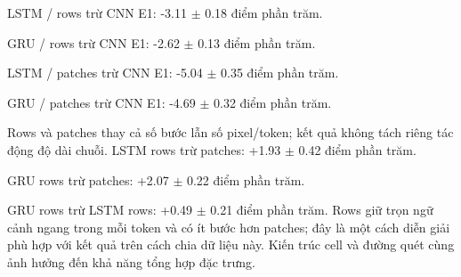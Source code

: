 LSTM / rows trừ CNN E1: -3.11 $\pm$ 0.18 điểm phần trăm.

GRU / rows trừ CNN E1: -2.62 $\pm$ 0.13 điểm phần trăm.

LSTM / patches trừ CNN E1: -5.04 $\pm$ 0.35 điểm phần trăm.

GRU / patches trừ CNN E1: -4.69 $\pm$ 0.32 điểm phần trăm.

Rows và patches thay cả số bước lẫn số pixel/token; kết quả không tách riêng tác động độ dài chuỗi.
LSTM rows trừ patches: +1.93 $\pm$ 0.42 điểm phần trăm.

GRU rows trừ patches: +2.07 $\pm$ 0.22 điểm phần trăm.

GRU rows trừ LSTM rows: +0.49 $\pm$ 0.21 điểm phần trăm. Rows giữ trọn ngữ cảnh ngang trong mỗi token và có ít bước hơn patches; đây là một cách diễn giải phù hợp với kết quả trên cách chia dữ liệu này. Kiến trúc cell và đường quét cùng ảnh hưởng đến khả năng tổng hợp đặc trưng.
